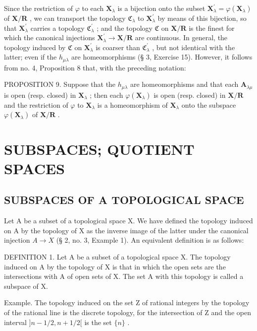 Since the restriction of \(\varphi\) to each \(\mathbf{X}_{\lambda}\) is a bijection onto the subset \(\mathbf{X}_{\lambda}^{\prime} = \varphi (\mathbf{X}_{\lambda})\) of \(\mathbf{X} / \mathbf{R}\) , we can transport the topology \(\mathfrak{C}_{\lambda}\) to \(\mathbf{X}_{\lambda}^{\prime}\) by means of this bijection, so that \(\mathbf{X}_{\lambda}^{\prime}\) carries a topology \(\mathfrak{C}_{\lambda}^{\prime}\) ; and the topology \(\mathfrak{C}\) on \(\mathbf{X} / \mathbf{R}\) is the finest for which the canonical injections \(\mathbf{X}_{\lambda}^{\prime} \to \mathbf{X} / \mathbf{R}\) are continuous. In general, the topology induced by \(\mathfrak{C}\) on \(\mathbf{X}_{\lambda}^{\prime}\) is coarser than \(\mathfrak{C}_{\lambda}^{\prime}\) , but not identical with the latter; even if the \(h_{\mu \lambda}\) are homeomorphisms (§ 3, Exercise 15). However, it follows from no. 4, Proposition 8 that, with the preceding notation:

PROPOSITION 9. Suppose that the \(h_{\mu \lambda}\) are homeomorphisms and that each \(\mathbf{A}_{\lambda \mu}\) is open (resp. closed) in \(\mathbf{X}_{\lambda}\) ; then each \(\varphi(\mathbf{X}_{\lambda})\) is open (resp. closed) in \(\mathbf{X}/\mathbf{R}\) and the restriction of \(\varphi\) to \(\mathbf{X}_{\lambda}\) is a homeomorphism of \(\mathbf{X}_{\lambda}\) onto the subspace \(\varphi(\mathbf{X}_{\lambda})\) of \(\mathbf{X}/\mathbf{R}\) .

\section{SUBSPACES; QUOTIENT SPACES}

\subsection{SUBSPACES OF A TOPOLOGICAL SPACE}

Let A be a subset of a topological space X. We have defined the topology induced on A by the topology of X as the inverse image of the latter under the canonical injection \(A \rightarrow X\) (§ 2, no. 3, Example 1). An equivalent definition is as follows:

DEFINITION 1. Let A be a subset of a topological space X. The topology induced on A by the topology of X is that in which the open sets are the intersections with A of open sets of X. The set A with this topology is called a subspace of X.

Example. The topology induced on the set Z of rational integers by the topology of the rational line is the discrete topology, for the intersection of Z and the open interval \(]n - 1/2, n + 1/2[\) is the set \(\{n\}\) .

